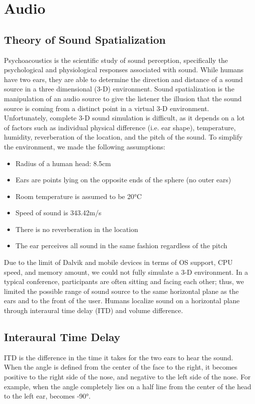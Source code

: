\documentclass[12pt, letterpaper]{article}
\begin{document}
\section{Audio}

\subsection{Theory of Sound Spatialization}
Psychoacoustics is the scientific study of sound perception, specifically the psychological and physiological responses associated with sound. While humans have two ears, they are able to determine the direction and distance of a sound source in a three dimensional (3-D) environment.  Sound spatialization is the manipulation of an audio source to give the listener the illusion that the sound source is coming from a distinct point in a virtual 3-D environment. Unfortunately, complete 3-D sound simulation is difficult, as it depends on a lot of factors such as individual physical difference (i.e. ear shape), temperature, humidity, reverberation of the location, and the pitch of the sound. To simplify the environment, we made the following assumptions:
\begin{itemize}
\item Radius of a human head: 8.5cm
\item Ears are points lying on the opposite ends of the sphere (no outer ears)
\item Room temperature is assumed to be 20°C
\item Speed of sound is 343.42m/s
\item There is no reverberation in the location
\item The ear perceives all sound in the same fashion regardless of the pitch
\end{itemize}
Due to the limit of Dalvik and mobile devices in terms of OS support, CPU speed, and memory amount, we could not fully simulate a 3-D environment. In a typical conference, participants are often sitting and facing each other; thus, we limited the possible range of sound source to the same horizontal plane as the ears and to the front of the user. Humans localize sound on a horizontal plane through interaural time delay (ITD) and volume difference.

\subsection{Interaural Time Delay}
ITD is the difference in the time it takes for the two ears to hear the sound. When the angle is defined from the center of the face to the right, it becomes positive to the right side of the nose, and negative to the left side of the nose. For example, when the angle completely lies on a half line from the center of the head to the left ear, becomes -90°.
\end{document}
